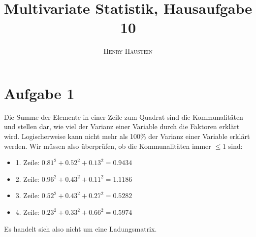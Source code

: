 \documentclass{article}
\title{\textbf{Multivariate Statistik, Hausaufgabe 10}}
\author{\textsc{Henry Haustein}}
\date{}
\begin{document}
	\maketitle
	
	\section*{Aufgabe 1}
	Die Summe der Elemente in einer Zeile zum Quadrat sind die Kommunalitäten und stellen dar, wie viel der Varianz einer Variable durch die Faktoren erklärt wird. Logischerweise kann nicht mehr als 100\% der Varianz einer Variable erklärt werden. Wir müssen also überprüfen, ob die Kommunalitäten immer $\le 1$ sind:
	\begin{itemize}
		\item 1. Zeile: $0.81^2 + 0.52^2 + 0.13^2 = 0.9434$
		\item 2. Zeile: $0.96^2 + 0.43^2 + 0.11^2 = 1.1186$ \Lightning
		\item 3. Zeile: $0.52^2 + 0.43^2 + 0.27^2 = 0.5282$
		\item 4. Zeile: $0.23^2 + 0.33^2 + 0.66^2 = 0.5974$
	\end{itemize}
	Es handelt sich also nicht um eine Ladungsmatrix.
\end{document}
